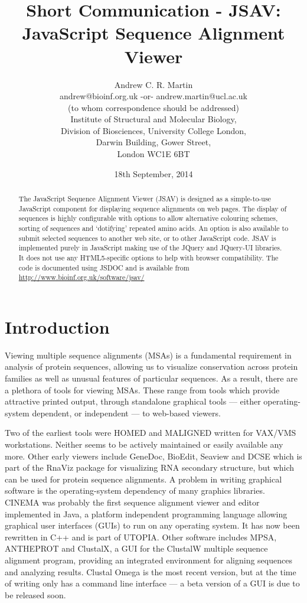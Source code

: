 \documentclass{article}
\title{Short Communication - JSAV: JavaScript Sequence Alignment Viewer}
\date{18th September, 2014}
\author{Andrew C. R. Martin\\
  andrew@bioinf.org.uk -or- andrew.martin@ucl.ac.uk \\
  (to whom correspondence should be addressed)\\
  Institute of Structural and Molecular Biology,\\
  Division of Biosciences, University College London,\\
  Darwin Building, Gower Street,\\
  London WC1E 6BT}
\begin{document}
\maketitle


\begin{abstract}
The JavaScript Sequence Alignment Viewer
(JSAV) is designed as a simple-to-use JavaScript component for
displaying sequence alignments on web pages.  The display of sequences
is highly configurable with options to allow alternative colouring
schemes, sorting of sequences and `dotifying' repeated amino acids. An
option is also available to submit selected sequences to another web
site, or to other JavaScript code. 
JSAV is implemented purely in JavaScript making use of the JQuery and
JQuery-UI libraries. It does not use any HTML5-specific options to help with
browser compatibility. The code is documented using JSDOC
and is available from \url{http://www.bioinf.org.uk/software/jsav/}
\end{abstract}


\section{Introduction}
Viewing multiple sequence alignments (MSAs) is a fundamental
requirement in analysis of protein sequences, allowing us to visualize
conservation across protein families as well as unusual features of
particular sequences. As a result, there are a plethora of tools for
viewing MSAs. These range from tools which provide attractive printed
output, through standalone graphical tools --- either operating-system
dependent, or independent --- to web-based viewers.

Two of the earliest tools were HOMED\cite{stockwell:homed} and
MALIGNED\cite{clark:maligned} written for VAX/VMS workstations.
Neither seems to be actively maintained or easily available any
more. Other early viewers include GeneDoc\cite{nicholas:genedoc},
BioEdit, Seaview\cite{galtier:seaview} and DCSE\cite{derijk:dcse}
which is part of the RnaViz package for visualizing RNA secondary
structure\cite{derijk:rnaviz}, but which can be used for protein
sequence alignments.  A problem in writing graphical software is the
operating-system dependency of many graphics libraries.
CINEMA\cite{parrysmith:cinema} was probably the first sequence
alignment viewer and editor implemented in Java, a platform
independent programming language allowing graphical user interfaces
(GUIs) to run on any operating system. It has now been rewritten in
C++ and is part of UTOPIA\cite{pettifer:utopia}. Other software
includes MPSA\cite{blanchet:mpsa}, ANTHEPROT\cite{deleage:antheprot}
and ClustalX\cite{thompson:clustalx}, a GUI for the ClustalW multiple
sequence alignment program, providing an integrated environment for
aligning sequences and analyzing results. Clustal Omega is the most
recent version, but at the time of writing only has a command line
interface --- a beta version of a GUI is due to be released soon.
\end{document}
